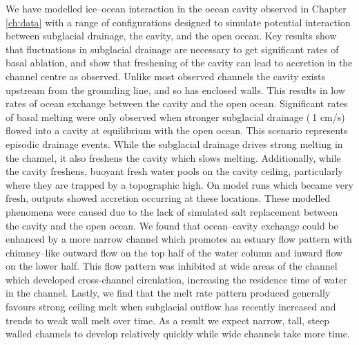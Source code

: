 We have modelled ice--ocean interaction in the ocean cavity observed in Chapter \ref{ch:data} with a range of configurations designed to simulate potential interaction between subglacial drainage, the cavity, and the open ocean. Key results show that fluctuations in subglacial drainage are necessary to get significant rates of basal ablation, and show that freshening of the cavity can lead to accretion in the channel centre as observed. Unlike most observed channels the cavity exists upstream from the grounding line, and so has enclosed walls. This results in low rates of ocean exchange between the cavity and the open ocean. Significant rates of basal melting were only observed when stronger subglacial drainage ($\>$1 cm/s) flowed into a cavity at equilibrium with the open ocean. This scenario represents episodic drainage events. While the subglacial drainage drives strong melting in the channel, it also freshens the cavity which slows melting.  Additionally, while the cavity freshens, buoyant fresh water pools on the cavity ceiling, particularly where they are trapped by a topographic high. On model runs which became very fresh, outputs showed accretion occurring at these locations. These modelled phenomena were caused due to the lack of simulated salt replacement between the cavity and the open ocean. We found that ocean--cavity exchange could be enhanced by a more narrow channel which promotes an estuary flow pattern with chimney--like outward flow on the top half of the water column and inward flow on the lower half. This flow pattern was inhibited at wide areas of the channel which developed cross-channel circulation, increasing the residence time of water in the channel. Lastly, we find that the melt rate pattern produced generally favours strong ceiling melt when subglacial outflow has recently increased and trends to weak wall melt over time. As a result we expect narrow, tall, steep walled channels to develop relatively quickly while wide channels take more time.


